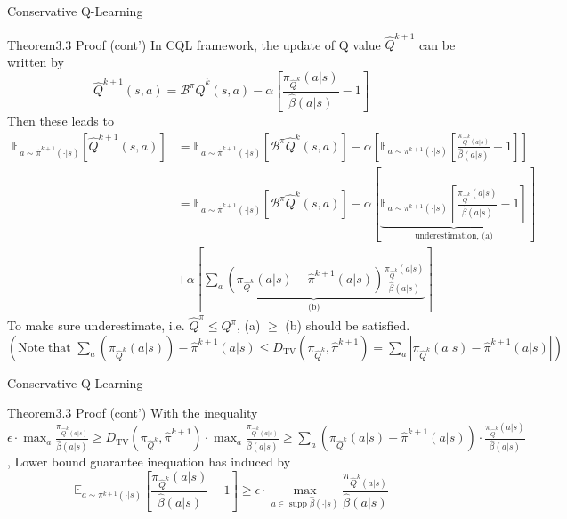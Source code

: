 \documentclass[11pt]{beamer}
\newcommand{\mbb}[1]{\mathbb{#1}}
\newcommand{\mc}[1]{\mathcal{#1}}
\newcommand{\abs}[1]{\left\lvert #1 \right\rvert}
\newcommand{\supp}{\operatorname{supp}}
\begin{document}
\begin{frame}{Conservative Q-Learning}
  \begin{block}{Theorem3.3 Proof (cont')}
    In CQL framework, the update of Q value $\hat{Q}^{k+1}$ can be written by
    \[
      \hat{Q}^{k+1}(s,a) = \mc{B}^{\pi}\hat{Q}^{k} (s,a) - \alpha \left[\frac{\pi_{\hat{Q}^k}(a|s)}{\hat{\beta}(a|s)} - 1\right]
    \]
    Then these leads to
    \[
      \begin{aligned}
        \mbb{E}_{a \sim \hat{\pi}^{k+1} (\cdot|s)} [\hat{Q}^{k+1} (s,a)] &= \mbb{E}_{a \sim \hat{\pi}^{k+1}(\cdot|s)} [\mc{B}^\pi \hat{Q}^k(s,a)] - \alpha \left[\mbb{E}_{a \sim \pi^{k+1}(\cdot|s)}\left[\frac{\pi_{\hat{Q}^k(a|s)}}{\hat{\beta}(a|s)} -1 \right] \right] \\
        &= \mbb{E}_{a \sim \hat{\pi}^{k+1}(\cdot | s)} [\mc{B}^\pi \hat{Q}^{k}(s,a)] - \alpha \left[\underbrace{\mbb{E}_{a \sim \pi^{k+1}(\cdot|s)}\left[\frac{\pi_{\hat{Q}^k}(a|s)}{\hat{\beta}(a|s)} -1\right]}_{\text{underestimation, (a)}} \right] \\
         &+ \alpha \left[ \underbrace{\sum_a \left( \pi_{\hat{Q}^k}(a|s) - \hat{\pi}^{k+1}(a|s)\right) \frac{\pi_{\hat{Q}^k}(a|s)}{\hat{\beta} (a|s)}}_{\text{(b)}}  \right]
      \end{aligned}
    \]
    To make sure underestimate, i.e. $\hat{Q}^{\pi} \leq Q^\pi$, (a) $\geq$ (b) should be satisfied.
    $\left( \text{Note that }\sum_a (\pi_{\hat{Q}^k}(a|s))-\hat{\pi}^{k+1}(a|s) \leq D_{\text{TV}}(\pi_{\hat{Q}^k}, \hat{\pi}^{k+1}) = \sum_a \abs{\pi_{\hat{Q}^k}(a|s) - \hat{\pi}^{k+1} (a|s)}\right)$
  \end{block}
\end{frame}

\begin{frame}{Conservative Q-Learning}
  \begin{block}{Theorem3.3 Proof (cont')}
    With the inequality $\epsilon \cdot \max_{a} \frac{\pi_{\hat{Q}^k(a|s)}}{\hat{\beta}(a|s)} \geq D_{\text{TV}}(\pi_{\hat{Q}^k}, \hat{\pi}^{k+1}) \cdot \max_a \frac{\pi_{\hat{Q}^k(a|s)}}{\hat{\beta}(a|s)} \geq \sum_a \left(\pi_{\hat{Q}^k}(a|s) - \hat{\pi}^{k+1}(a|s)\right) \cdot \frac{\pi_{\hat{Q}^k}(a|s)}{\hat{\beta}(a|s)}$,
    Lower bound guarantee inequation has induced by
    \[
      \mbb{E}_{a \sim \pi^{k+1}(\cdot|s)}\left[\frac{\pi_{\hat{Q}^k}(a|s)}{\hat{\beta}(a|s)} -1\right] \geq \epsilon \cdot \max_{a \in \supp \hat{\beta}(\cdot | s)} \frac{\pi_{\hat{Q}^k(a|s)}}{\hat{\beta}(a|s)}
    \]
  \end{block}
\end{frame}
\end{document}

